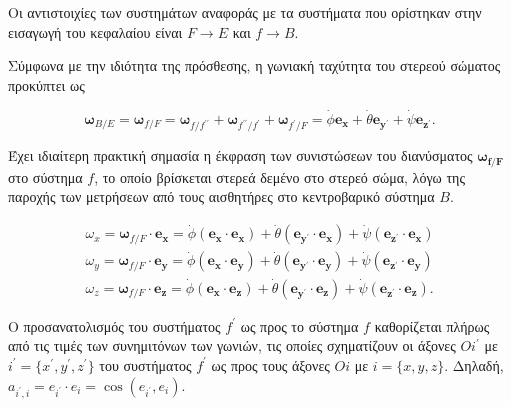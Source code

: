 Οι αντιστοιχίες των συστημάτων αναφοράς με τα συστήματα που ορίστηκαν στην 
εισαγωγή του κεφαλαίου είναι \(F \to E\) και \(f \to B\).

Σύμφωνα με την ιδιότητα της πρόσθεσης, η γωνιακή ταχύτητα του στερεού σώματος 
προκύπτει ως

\begin{equation*}
    \bm{\omega}_{B/E} = {\bm{\omega}_{f/F}} = \bm{\omega}_{f/f^{\prime\prime}} + 
        \bm{\omega}_{f^{\prime\prime}/f^{\prime}} + 
        \bm{\omega}_{f^{\prime}/F} = \dot{\phi} \mathbf{e_{x}}
         + \dot{\theta} \mathbf{e_{y^{\prime}}}
         + \dot{\psi} \mathbf{e_{z^{\prime}}}.
\end{equation*}

Έχει ιδιαίτερη πρακτική σημασία η έκφραση των συνιστώσεων του διανύσματος 
\(\boldsymbol{\omega_{f/F}}\) στο σύστημα \(f\), το οποίο βρίσκεται στερεά 
δεμένο στο στερεό σώμα, λόγω της παροχής των μετρήσεων από τους αισθητήρες στο
κεντροβαρικό σύστημα \(B\).

\begin{equation} \label{knm:rot_coord}
    \begin{split}
    \omega_{x} = \bm{\omega}_{f/F} \cdot \mathbf{e_{x}} = 
        \dot{\phi}(\mathbf{e_{x}} \cdot \mathbf{e_{x}}) + 
        \dot{\theta}(\mathbf{e_{y^{\prime}}} \cdot \mathbf{e_{x}}) + 
        \dot{\psi}(\mathbf{e_{z^{\prime}}} \cdot \mathbf{e_{x}}) \\
    \omega_{y} = \bm{\omega}_{f/F} \cdot \mathbf{e_{y}} = 
        \dot{\phi}(\mathbf{e_{x}} \cdot \mathbf{e_{y}}) + 
        \dot{\theta}(\mathbf{e_{y^{\prime}}} \cdot \mathbf{e_{y}}) + 
        \dot{\psi}(\mathbf{e_{z^{\prime}}} \cdot \mathbf{e_{y}}) \\
    \omega_{z} = \bm{\omega}_{f/F} \cdot \mathbf{e_{z}} = 
        \dot{\phi}(\mathbf{e_{x}} \cdot \mathbf{e_{z}}) + 
        \dot{\theta}(\mathbf{e_{y^{\prime}}} \cdot \mathbf{e_{z}}) + 
        \dot{\psi}(\mathbf{e_{z^{\prime}}} \cdot \mathbf{e_{z}}).
    \end{split}
\end{equation}

Ο προσανατολισμός του συστήματος \(f^{\prime}\) ως προς το σύστημα \(f\) 
καθορίζεται πλήρως από τις τιμές των συνημιτόνων των γωνιών, τις οποίες 
σχηματίζουν οι άξονες \(Oi^{\prime}\) με \(i^{\prime} = \{x^{\prime}, y^{\prime},
z^{\prime}\}\) του συστήματος \(f^{\prime}\) ως προς τους άξονες \(Oi\) με 
\(i= \{x, y, z\}\). Δηλαδή, \(a_{i^{\prime},i} = e_{i^{\prime}} \cdot e_{i} = 
\cos(e_{i^{\prime}}, e_{i})\).

